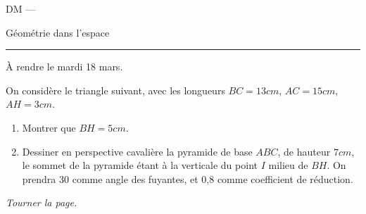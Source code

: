 \documentclass[11pt]{article}
\begin{document}
\begin{center}
  \textsc{DM}
  ---
  {
    \Large
    Géométrie dans l'espace

    \hrule
  }
\end{center}

\begin{em}
  À rendre le mardi 18 mars.
\end{em}

\begin{exercice}
  On considère le triangle suivant, avec les longueurs $BC=13cm$, $AC=15cm$, $AH=3cm$.


  \begin{enumerate}
    \item Montrer que $BH=5cm$.
    \item Dessiner en perspective cavalière la pyramide de base $ABC$, de hauteur $7cm$, le sommet de la pyramide étant à la verticale du point $I$ milieu de $BH$. On prendra 30 comme angle des fuyantes, et 0,8 comme coefficient de réduction.
  \end{enumerate}
\end{exercice}

\hfill\emph{Tourner la page.}
\newpage
\end{document}
